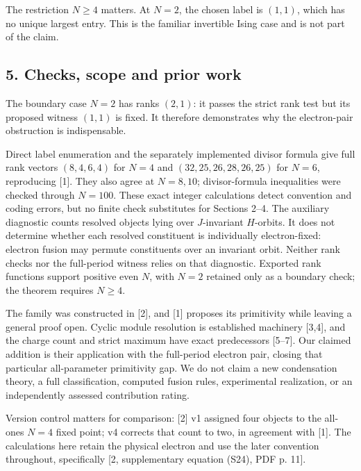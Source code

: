 \documentclass[
  11pt,
]{article}
\begin{document}
The restriction \(N\ge4\) matters. At \(N=2\), the chosen label is
\((1,1)\), which has no unique largest entry. This is the familiar
invertible Ising case and is not part of the claim.

\subsection{5. Checks, scope and prior
work}\label{checks-scope-and-prior-work}

The boundary case \(N=2\) has ranks \((2,1)\): it passes the strict
rank test but its proposed witness \((1,1)\) is fixed. It therefore
demonstrates why the electron-pair obstruction is indispensable.

Direct label enumeration and the separately implemented divisor formula give full
rank vectors \((8,4,6,4)\) for \(N=4\) and \((32,25,26,28,26,25)\) for
\(N=6\), reproducing {[}1{]}. They also agree at \(N=8,10\);
divisor-formula inequalities were checked through \(N=100\). These exact
integer calculations detect convention and coding errors, but no finite
check substitutes for Sections 2--4. The auxiliary diagnostic counts
resolved objects lying over \(J\)-invariant \(H\)-orbits. It does not
determine whether each resolved constituent is individually electron-fixed:
electron fusion may permute constituents over an invariant orbit.
Neither rank checks nor the full-period witness relies on that diagnostic.
Exported rank functions support positive even \(N\), with \(N=2\)
retained only as a boundary check; the theorem requires \(N\ge4\).

The family was constructed in {[}2{]}, and {[}1{]} proposes its
primitivity while leaving a general proof open. Cyclic module resolution
is established machinery {[}3,4{]}, and the charge count and strict
maximum have exact predecessors {[}5--7{]}. Our claimed addition is their
application with the full-period electron pair, closing that particular
all-parameter primitivity gap. We do not
claim a new condensation theory, a full classification, computed fusion
rules, experimental realization, or an independently assessed
contribution rating.

Version control matters for comparison: {[}2{]} v1 assigned four objects
to the all-ones \(N=4\) fixed point; v4 corrects that count to two, in
agreement with {[}1{]}. The calculations here retain the physical
electron and use the later convention throughout, specifically {[}2,
supplementary equation (S24), PDF p. 11{]}.
\end{document}
